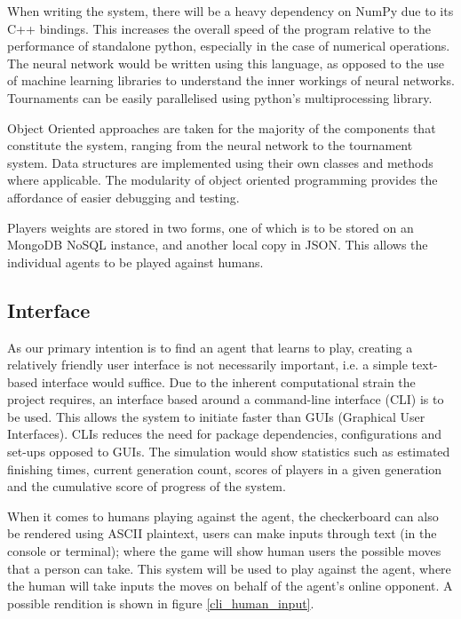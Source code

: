 \documentclass[12pt,a4paper]{article}
\begin{document}
    When writing the system, there will be a heavy dependency on NumPy due to its C++ bindings. This increases the overall speed of the program relative to the performance of standalone python, especially in the case of numerical operations. The neural network would be written using this language, as opposed to the use of machine learning libraries to understand the inner workings of neural networks. Tournaments can be easily parallelised using python's multiprocessing library.

    Object Oriented approaches are taken for the majority of the components that constitute the system, ranging from the neural network to the tournament system. Data structures are implemented using their own classes and methods where applicable. The modularity of object oriented programming provides the affordance of easier debugging and testing.

    Players weights are stored in two forms, one of which is to be stored on an MongoDB NoSQL instance, and another local copy in JSON. This allows the individual agents to be played against humans.


\subsection*{Interface}


    As our primary intention is to find an agent that learns to play, creating a relatively friendly user interface is not necessarily important, i.e. a simple text-based interface would suffice. Due to the inherent computational strain the project requires, an interface based around a command-line interface (CLI) is to be used. This allows the system to initiate faster than GUIs (Graphical User Interfaces). CLIs reduces the need for package dependencies, configurations and set-ups opposed to GUIs. The simulation would show statistics such as estimated finishing times, current generation count, scores of players in a given generation and the cumulative score of progress of the system.

    When it comes to humans playing against the agent, the checkerboard can also be rendered using ASCII plaintext, users can make inputs through text (in the console or terminal); where the game will show human users the possible moves that a person can take. This system will be used to play against the agent, where the human will take inputs the moves on behalf of the agent's online opponent. A possible rendition is shown in figure \ref{cli_human_input}.
\end{document}
